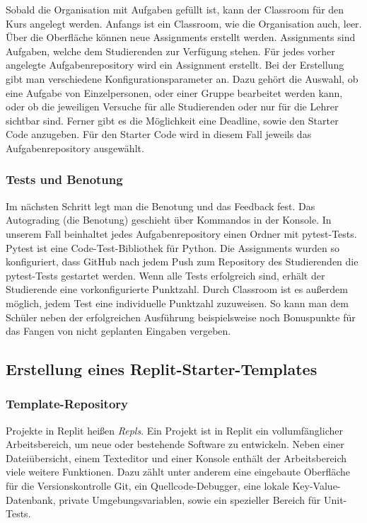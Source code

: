 Sobald die Organisation mit Aufgaben gefüllt ist, kann der
Classroom für den Kurs angelegt werden. Anfangs ist ein Classroom, wie die
Organisation auch, leer. Über die Oberfläche können neue Assignments
erstellt werden. Assignments sind Aufgaben, welche dem Studierenden zur
Verfügung stehen. Für jedes vorher angelegte Aufgabenrepository wird ein
Assignment erstellt. Bei der Erstellung gibt man verschiedene
Konfigurationsparameter an. Dazu gehört die Auswahl, ob eine Aufgabe von
Einzelpersonen, oder einer Gruppe bearbeitet werden kann, oder ob die jeweiligen
Versuche für alle Studierenden oder nur für die Lehrer sichtbar sind. Ferner
gibt es die Möglichkeit eine Deadline, sowie den Starter Code anzugeben. Für den
Starter Code wird in diesem Fall jeweils das Aufgabenrepository ausgewählt.
\parencite{github-assignment-erstellen}

\subsubsection{Tests und Benotung}\label{classroom-tests}
Im nächsten Schritt legt man die Benotung und das Feedback fest. Das Autograding
(die Benotung) geschieht über Kommandos in der Konsole. In unserem Fall
beinhaltet jedes Aufgabenrepository einen Ordner mit pytest-Tests. Pytest ist
eine Code-Test-Bibliothek für Python. Die Assignments wurden so konfiguriert,
dass GitHub nach jedem Push zum Repository des Studierenden die pytest-Tests
gestartet werden. Wenn alle Tests erfolgreich sind, erhält der Studierende eine
vorkonfigurierte Punktzahl. Durch Classroom ist es außerdem möglich, jedem
Test eine individuelle Punktzahl zuzuweisen. So kann man dem Schüler neben der
erfolgreichen Ausführung beispielsweise noch Bonuspunkte für das Fangen von
nicht geplanten Eingaben vergeben. \parencite{github-assignment-erstellen}


\newpage

\subsection{Erstellung eines Replit-Starter-Templates}\label{replit-template}
\subsubsection{Template-Repository}\label{replit-template-repository}
Projekte in Replit heißen \emph{Repls}. Ein Projekt ist in Replit ein
vollumfänglicher Arbeitsbereich, um neue oder bestehende Software zu entwickeln.
Neben einer Dateiübersicht, einem Texteditor und einer Konsole enthält der
Arbeitsbereich viele weitere Funktionen. Dazu zählt unter anderem eine
eingebaute Oberfläche für die Versionskontrolle Git, ein Quellcode-Debugger,
eine lokale Key-Value-Datenbank, private Umgebungsvariablen, sowie ein
spezieller Bereich für Unit-Tests.

